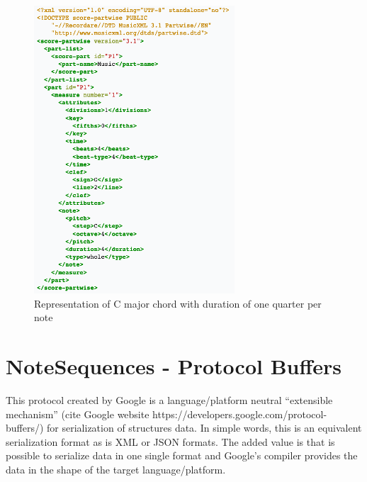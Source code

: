 \begin{figure}[h!]
    \caption{Representation of C major chord with duration of one quarter per note}
    \includegraphics[width=\linewidth]{image/fig_JDF29.png}
\end{figure}


\section{NoteSequences - Protocol Buffers}

This protocol created by Google is a language/platform neutral “extensible mechanism”
(cite Google website https://developers.google.com/protocol-buffers/) for serialization of
structures data. In simple words, this is an equivalent serialization format as is XML or
JSON formats. The added value is that is possible to serialize data in one single format
and Google’s compiler provides the data in the shape of the target language/platform.

